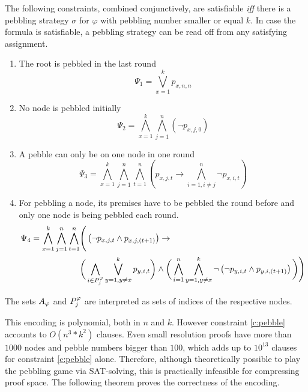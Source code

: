 \begin{definition}
The following constraints, combined conjunctively, are satisfiable \textit{iff} there is a pebbling strategy $\sigma$ for $\varphi$ with pebbling number smaller or equal $k$. 
In case the formula is satisfiable, a pebbling strategy can be read off from any satisfying assignment.

\begin{enumerate}
	\item The root is pebbled in the last round
				$$\Psi_1 = \bigvee_{x = 1}^k p_{x,n,n}$$
				
	\item No node is pebbled initially\\
				$$\Psi_2 = \bigwedge_{x = 1}^k \bigwedge_{j = 1}^n \left(\neg p_{x,j,0} \right)$$

	\item A pebble can only be on one node in one round
				$$\Psi_3 = \bigwedge_{x = 1}^k \bigwedge_{j = 1}^n \bigwedge_{t = 1}^n \left( p_{x,j,t} \rightarrow \bigwedge_{i = 1, i \neq j}^n \neg p_{x,i,t} \right)$$ 
				
	\item \label{c:pebble} For pebbling a node, its premises have to be pebbled the round before and only one node is being pebbled each round.\\
				\begin{align*}
					\Psi_4 = \bigwedge_{x = 1}^k \bigwedge_{j = 1}^n \bigwedge_{t = 1}^n & \Bigg( \left(\neg p_{x,j,t} \wedge p_{x,j,(t+1)} \right)\rightarrow \\
					&\bigg( \bigwedge_{i \in P_{j}^{\varphi}} \bigvee_{y = 1, y \neq x}^k p_{y,i,t} \bigg) \wedge 
					\bigg( \bigwedge_{i = 1}^n \bigwedge_{y = 1, y \neq x}^k \neg \left( \neg p_{y,i,t} \wedge p_{y,i,(t+1)} \right) \bigg) \Bigg)
				\end{align*}
				
\end{enumerate}

The sets $A_{\varphi}$ and $P_{j}^{\varphi}$ are interpreted as sets of indices of the respective nodes.

\end{definition}

\noindent
This encoding is polynomial, both in $n$ and $k$. However constraint \ref{c:pebble} accounts to $O(n^3*k^2)$ clauses. 
Even small resolution proofs have more than $1000$ nodes and pebble numbers bigger than $100$, which adds up to $10^{13}$ clauses for constraint \ref{c:pebble} alone. 
Therefore, although theoretically possible to play the pebbling game via SAT-solving, this is practically infeasible for compressing proof space.
The following theorem proves the correctness of the encoding.

